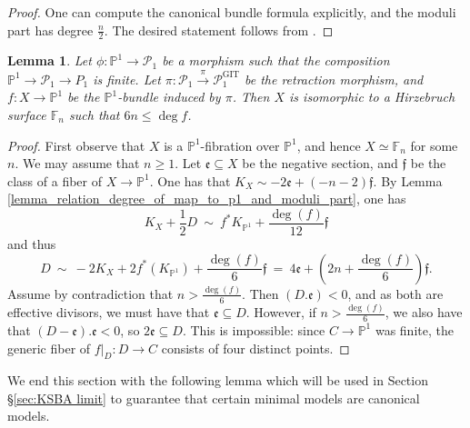 \documentclass[a4paper,12pt]{amsart}
\newcommand{\mtf}[1]{\mathfrak{#1}}
\DeclareMathOperator{\GIT}{GIT}
\newcommand{\bF}{\mathbb{F}}
\newcommand{\bP}{{\mathbb P}}
\newcommand{\sP}{{\mathscr{P}}}
\newtheorem{lemma}[theorem]{Lemma}
\theoremstyle{definition}
\theoremstyle{remark}
\begin{document}
\begin{proof}
   One can compute the canonical bundle formula explicitly, and the moduli part has degree $\frac{n}{2}$. The desired statement follows from .
\end{proof}

\begin{lemma}\label{lem: Hirzebruch}
    Let $\phi:\bP^1\to \sP_1$ be a morphism such that the composition $ \bP^1 \rightarrow   \sP_1  \rightarrow  P_1 $ is finite. Let $\pi:\sP_1\xrightarrow{\pi}\sP_1^{\GIT}$ be the retraction morphism, and $f\colon X\to \bP^1$ be the $\bP^1$-bundle induced by $\pi$. Then $X$ is isomorphic to a Hirzebruch surface $\mathbb{F}_n$ such that $6n\le \deg f$.
\end{lemma}
\begin{proof}
First observe that $X$ is a $\bP^1$-fibration over $\bP^1$, and hence $X\simeq \bF_n$ for some $n$. We may assume that $n\geq 1$. Let $\mtf{e}\subseteq X$ be the negative section, and $\mtf{f}$ be the class of a fiber of $X\to \bP^1$. One has that $K_X \sim -2\mtf{e} + (-n-2)\mtf{f}$. By Lemma \ref{lemma_relation_degree_of_map_to_p1_and_moduli_part}, one has
    \[\textstyle
    K_X + \frac{1}{2}D \ \sim \  f^*K_{\bP^1}+\frac{\deg(f)}{12}\mtf{f}\]  and thus \[ \textstyle D \ \sim \  -2K_X + 2f^*(K_{\bP^1})+\frac{\deg(f)}{6}\mtf{f}\ =\  4\mtf{e} + (2n + \frac{\deg(f)}{6})\mtf{f}.
    \]
    Assume by contradiction that $n>\frac{\deg(f)}{6}$. Then $(D.\mtf{e})<0$, and as both are effective divisors, we must have that $\mtf{e}\subseteq D$. However, if $n>\frac{\deg(f)}{6}$, we also have that $(D - \mtf{e}).\mtf{e}<0$, so $2\mtf{e}\subseteq D$. This is impossible: since $C\to \bP^1$ was finite, the generic fiber of $f|_{D}:D\to C$ consists of four distinct points.
\end{proof}
We end this section with the following lemma which will be used in Section \S\ref{sec:KSBA limit} to guarantee that certain minimal models are canonical models.
\end{document}
